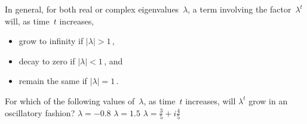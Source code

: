 In general, for both real or complex eigenvalues~\(\lambda\), a term involving the factor~\(\lambda^t\) will, as time~\(t\) increases,
\begin{itemize}
\item grow to infinity if \(|\lambda|>1\)\,,
\item decay to zero if \(|\lambda|<1\)\,, and
\item remain the same  if \(|\lambda|=1\)\,.
\end{itemize}




\begin{activity}
For which of the following values of~\(\lambda\), as time~\(t\) increases, will \(\lambda^t\) grow in an oscillatory fashion?
{\(\lambda=-0.8\)}
{\(\lambda=1.5\)}
{\(\lambda=\frac35+i\frac45\)}
\end{activity}




